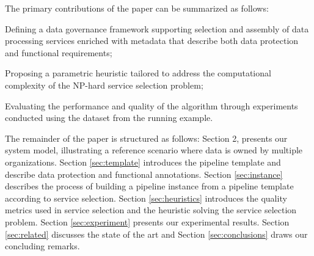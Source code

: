 The primary contributions of the paper can be summarized as follows:
\begin{enumerate*}
  \item Defining a data governance framework supporting selection and assembly of data processing services enriched with metadata that describe both data protection and functional requirements;
  \item Proposing a parametric heuristic tailored to address the computational complexity of the NP-hard service selection problem;
  \item Evaluating the performance and quality of the algorithm through experiments conducted using the dataset from the running example.
\end{enumerate*}

The remainder of the paper is structured as follows: Section 2, presents our system model, illustrating a reference scenario where data is owned by multiple organizations. Section \ref{sec:template} introduces the pipeline template and describe data protection and functional annotations. Section \ref{sec:instance} describes the process of building a pipeline instance from a pipeline template according to service selection. Section \ref{sec:heuristics} introduces the quality metrics used in service selection and the heuristic solving the service selection problem. Section \ref{sec:experiment} presents our experimental results. Section \ref{sec:related} discusses the state of the art and Section \ref{sec:conclusions} draws our concluding remarks.